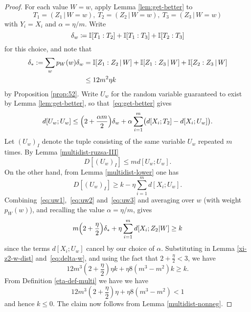 \begin{proof} For each value $W=w$, apply Lemma \ref{lem:get-better} to
  \[
    T_1 = (Z_1 \,|\, W \mathop{=} w),\
    T_2 = (Z_2 \,|\, W \mathop{=} w),\
    T_3 = (Z_3 \,|\, W \mathop{=} w)
  \]
  with $Y_i=X_i$ and $\alpha=\eta/m$.  Write
  \[
    \delta_w \coloneqq \mathbb{I}[T_1 : T_2] + \mathbb{I}[T_1 : T_3] + \mathbb{I}[T_2 : T_3]
  \]
  for this choice, and note that
  \begin{align}
    \label{eq:delta-w}
    \nonumber
    \delta_\ast := \sum_w p_W(w) \delta_w &= \mathbb{I}[Z_1 : Z_2 \,|\, W] + \mathbb{I}[Z_1 : Z_3 \,|\, W] + \mathbb{I}[Z_2 : Z_3 \,|\, W] \\
                           & \leq 12 m^2 \eta k
  \end{align}
  by Proposition \ref{prop:52}.
  Write $U_w$ for the random variable guaranteed to exist by Lemma \ref{lem:get-better},
  so that~\eqref{eq:get-better} gives \begin{equation}
    \label{eq:uw1}
    d[U_w; U_w] \leq \Bigl( 2 + \frac{\alpha m}{2} \Bigr) \delta_w + \alpha \sum_{i=1}^m \bigl( d[X_i; T_2] - d[X_i; U_w] \bigr).
  \end{equation}
  Let $(U_w)_I$ denote the tuple consisting of the same variable $U_w$ repeated $m$ times.
  By Lemma \ref{multidist-ruzsa-III}
  \begin{equation}
    \label{eq:uw2}
    D[(U_w)_I] \leq m d[U_w; U_w].
  \end{equation}
  On the other hand, from Lemma \ref{multidist-lower} one has
  \begin{equation}
    \label{eq:uw3}
    D[(U_w)_I] \geq k - \eta \sum_{i=1}^m d[X_i;U_w].
  \end{equation}
  Combining~\eqref{eq:uw1},~\eqref{eq:uw2} and~\eqref{eq:uw3} and averaging over $w$ (with weight $p_W(w)$), and recalling the value $\alpha=\eta/m$, gives
  \[
     m \Bigl( 2 + \frac{\eta}{2} \Bigr) \delta_\ast + \eta \sum_{i=1}^m d[X_i; Z_2 | W]
    \geq k
  \]
  since the terms $d[X_i; U_w]$ cancel by our choice of $\alpha$.
  Substituting in Lemma \ref{xi-z2-w-dist} and~\eqref{eq:delta-w}, and using the fact that $2 + \frac{\eta}{2} < 3$, we have
  \[
    12 m^3 (2+\frac{\eta}{2}) \eta k + \eta 8(m^3-m^2) k \geq k.
  \]
  From Definition \ref{eta-def-multi} we have we have
  $$ 12 m^3 (2+\frac{\eta}{2}) \eta + \eta 8(m^3-m^2) < 1$$
  and hence $k \leq 0$.  The claim now follows from Lemma \ref{multidist-nonneg}.
\end{proof}

